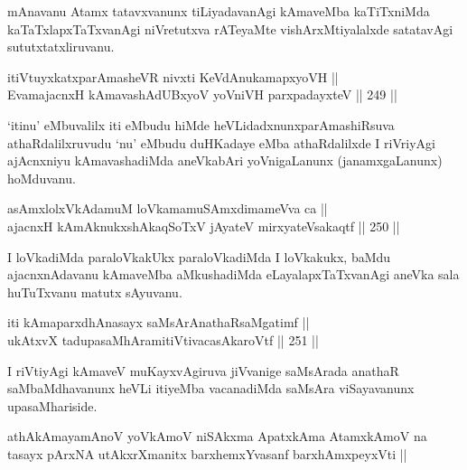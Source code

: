 \begin{artha}
mAnavanu Atamx tatavxvanunx tiLiyadavanAgi kAmaveMba kaTiTxniMda
kaTaTxlapxTaTxvanAgi niVretutxva rATeyaMte vishArxMtiyalalxde satatavAgi
sututxtatxliruvanu.
\end{artha}

\begin{shl}
itiVtuyxkatxparAmasheVR nivxti KeVdAnukamapxyoVH || \\
EvamajacnxH kAmavashAdUBxyoV yoVniVH parxpadayxteV \hfill || 249 ||  
\end{shl}

\begin{artha}
`itinu' eMbuvalilx iti eMbudu hiMde heVLidadxnunx\break parAmashiRsuva
athaRdalilxruvudu `nu' eMbudu duHKadaye eMba athaRdalilxde I riVriyAgi
ajAcnxniyu kAmavashadiMda aneVkabAri yoVnigaLanunx (janamxgaLanunx)
hoMduvanu.
\end{artha}


\begin{shl}
asAmxlolxVkAdamuM loVkamamuSAmxdimameVva ca || \\
ajacnxH kAmAknukxshAkaqSoTxV jAyateV mirxyateV\s sakaqtf \hfill || 250 ||  
\end{shl}

\begin{artha}
I loVkadiMda paraloVkakUkx paraloVkadiMda I loVkakukx, baMdu
ajacnxnAdavanu kAmaveMba aMkushadiMda eLayalapxTaTxvanAgi aneVka sala
huTuTxvanu matutx sAyuvanu.
\end{artha}

\begin{shl}
iti kAmaparxdhAnasayx saMsArAnathaRsaMgatimf || \\
ukAtxvX tadupasaMhAramitiVtivacasA\s karoVtf \hfill || 251 ||  
\end{shl}

\begin{artha}
I riVtiyAgi kAmaveV muKayxvAgiruva jiVvanige saMsArada anathaR
saMbaMdhavanunx heVLi itiyeMba vacanadiMda saMsAra viSayavanunx
upasaMhariside.
\end{artha}


\begin{kandikeshl}
athAkAmayamAnoV yoV\s kAmoV niSAkxma ApatxkAma AtamxkAmoV na tasayx pArxNA utAkxrXmanitx barxhemxYvasanf barxhAmxpeyxVti ||
\end{kandikeshl}


